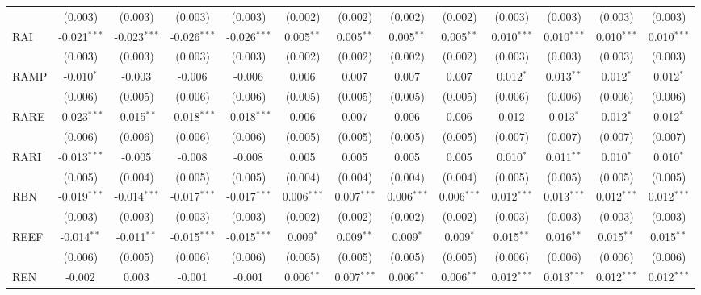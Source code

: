 \begin{table}[!htbp]
\begin{tabular}{@{\extracolsep{5pt}}lcccccccccccc}
  & (0.003) & (0.003) & (0.003) & (0.003) & (0.002) & (0.002) & (0.002) & (0.002) & (0.003) & (0.003) & (0.003) & (0.003) \\
 RAI & -0.021$^{***}$ & -0.023$^{***}$ & -0.026$^{***}$ & -0.026$^{***}$ & 0.005$^{**}$ & 0.005$^{**}$ & 0.005$^{**}$ & 0.005$^{**}$ & 0.010$^{***}$ & 0.010$^{***}$ & 0.010$^{***}$ & 0.010$^{***}$ \\
  & (0.003) & (0.003) & (0.003) & (0.003) & (0.002) & (0.002) & (0.002) & (0.002) & (0.003) & (0.003) & (0.003) & (0.003) \\
 RAMP & -0.010$^{*}$ & -0.003$^{}$ & -0.006$^{}$ & -0.006$^{}$ & 0.006$^{}$ & 0.007$^{}$ & 0.007$^{}$ & 0.007$^{}$ & 0.012$^{*}$ & 0.013$^{**}$ & 0.012$^{*}$ & 0.012$^{*}$ \\
  & (0.006) & (0.005) & (0.006) & (0.006) & (0.005) & (0.005) & (0.005) & (0.005) & (0.006) & (0.006) & (0.006) & (0.006) \\
 RARE & -0.023$^{***}$ & -0.015$^{**}$ & -0.018$^{***}$ & -0.018$^{***}$ & 0.006$^{}$ & 0.007$^{}$ & 0.006$^{}$ & 0.006$^{}$ & 0.012$^{}$ & 0.013$^{*}$ & 0.012$^{*}$ & 0.012$^{*}$ \\
  & (0.006) & (0.006) & (0.006) & (0.006) & (0.005) & (0.005) & (0.005) & (0.005) & (0.007) & (0.007) & (0.007) & (0.007) \\
 RARI & -0.013$^{***}$ & -0.005$^{}$ & -0.008$^{}$ & -0.008$^{}$ & 0.005$^{}$ & 0.005$^{}$ & 0.005$^{}$ & 0.005$^{}$ & 0.010$^{*}$ & 0.011$^{**}$ & 0.010$^{*}$ & 0.010$^{*}$ \\
  & (0.005) & (0.004) & (0.005) & (0.005) & (0.004) & (0.004) & (0.004) & (0.004) & (0.005) & (0.005) & (0.005) & (0.005) \\
 RBN & -0.019$^{***}$ & -0.014$^{***}$ & -0.017$^{***}$ & -0.017$^{***}$ & 0.006$^{***}$ & 0.007$^{***}$ & 0.006$^{***}$ & 0.006$^{***}$ & 0.012$^{***}$ & 0.013$^{***}$ & 0.012$^{***}$ & 0.012$^{***}$ \\
  & (0.003) & (0.003) & (0.003) & (0.003) & (0.002) & (0.002) & (0.002) & (0.002) & (0.003) & (0.003) & (0.003) & (0.003) \\
 REEF & -0.014$^{**}$ & -0.011$^{**}$ & -0.015$^{***}$ & -0.015$^{***}$ & 0.009$^{*}$ & 0.009$^{**}$ & 0.009$^{*}$ & 0.009$^{*}$ & 0.015$^{**}$ & 0.016$^{**}$ & 0.015$^{**}$ & 0.015$^{**}$ \\
  & (0.006) & (0.005) & (0.006) & (0.006) & (0.005) & (0.005) & (0.005) & (0.005) & (0.006) & (0.006) & (0.006) & (0.006) \\
 REN & -0.002$^{}$ & 0.003$^{}$ & -0.001$^{}$ & -0.001$^{}$ & 0.006$^{**}$ & 0.007$^{***}$ & 0.006$^{**}$ & 0.006$^{**}$ & 0.012$^{***}$ & 0.013$^{***}$ & 0.012$^{***}$ & 0.012$^{***}$ \\

\end{tabular}
\end{table}
